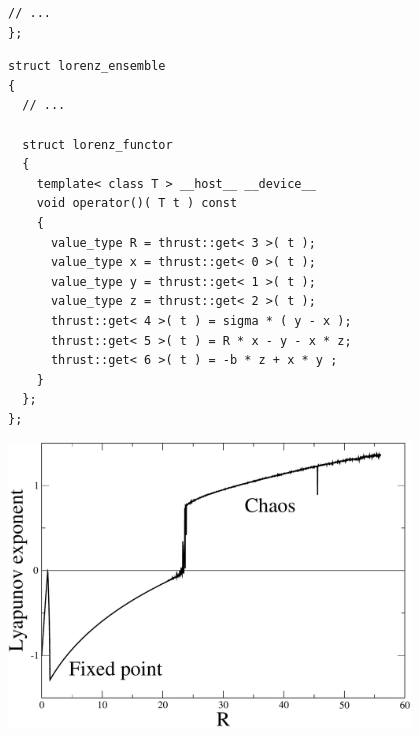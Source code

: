 {\begin{frame}[fragile]
\begin{lstlisting}[basicstyle=\scriptsize\ttfamily]
  // ...
};
 \end{lstlisting}


\end{frame}


\begin{frame}[fragile]


 \begin{lstlisting}[basicstyle=\scriptsize\ttfamily]
struct lorenz_ensemble
{
  // ...

  struct lorenz_functor
  {
    template< class T > __host__ __device__
    void operator()( T t ) const
    {
      value_type R = thrust::get< 3 >( t );
      value_type x = thrust::get< 0 >( t );
      value_type y = thrust::get< 1 >( t );
      value_type z = thrust::get< 2 >( t );
      thrust::get< 4 >( t ) = sigma * ( y - x );
      thrust::get< 5 >( t ) = R * x - y - x * z;
      thrust::get< 6 >( t ) = -b * z + x * y ;
    }
  };
};
 \end{lstlisting}


\end{frame}




\begin{frame}[fragile]


 \vspace{4ex}

\centerline{\includegraphics[draft=false,width=0.8\textwidth]{lyap_lorenz.pdf}}

\end{frame}

}









